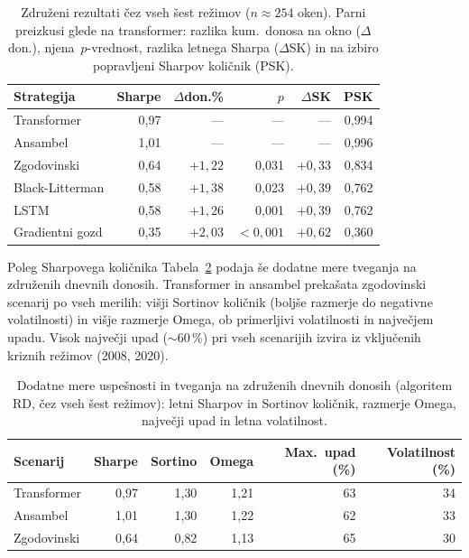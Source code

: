 \begin{table}[htbp]
  \centering
  \caption{Združeni rezultati čez vseh šest režimov ($n\approx 254$ oken). Parni preizkusi glede na transformer: razlika kum.\ donosa na okno ($\Delta$don.), njena~$p$-vrednost, razlika letnega Sharpa ($\Delta$SK) in na izbiro popravljeni Sharpov količnik (PSK).}
  \label{tab:pooled}
  \begin{tabular}{lrrrrr}
    \toprule
    Strategija & Sharpe & $\Delta$don.\% & $p$ & $\Delta$SK & PSK\\
    \midrule
    Transformer      & 0{,}97 & ---   & ---     & ---    & 0{,}994\\
    Ansambel         & 1{,}01 & ---   & ---     & ---    & 0{,}996\\
    Zgodovinski      & 0{,}64 & $+1{,}22$ & 0{,}031 & $+0{,}33$ & 0{,}834\\
    Black-Litterman  & 0{,}58 & $+1{,}38$ & 0{,}023 & $+0{,}39$ & 0{,}762\\
    LSTM             & 0{,}58 & $+1{,}26$ & 0{,}001 & $+0{,}39$ & 0{,}762\\
    Gradientni gozd  & 0{,}35 & $+2{,}03$ & $<0{,}001$ & $+0{,}62$ & 0{,}360\\
    \bottomrule
  \end{tabular}
\end{table}

Poleg Sharpovega količnika Tabela~\ref{tab:pooledrisk} podaja še dodatne mere tveganja na združenih dnevnih donosih. Transformer in ansambel prekašata zgodovinski scenarij po vseh merilih: višji Sortinov količnik (boljše razmerje do negativne volatilnosti) in višje razmerje Omega, ob primerljivi volatilnosti in največjem upadu. Visok največji upad ($\sim\!60\,\%$) pri vseh scenarijih izvira iz vključenih kriznih režimov (2008, 2020).

\begin{table}[htbp]
  \centering
  \caption{Dodatne mere uspešnosti in tveganja na združenih dnevnih donosih (algoritem RD, čez vseh šest režimov): letni Sharpov in Sortinov količnik, razmerje Omega, največji upad in letna volatilnost.}
  \label{tab:pooledrisk}
  \begin{tabular}{lrrrrr}
    \toprule
    Scenarij & Sharpe & Sortino & Omega & Max.\ upad (\%) & Volatilnost (\%)\\
    \midrule
    Transformer & 0{,}97 & 1{,}30 & 1{,}21 & 63 & 34\\
    Ansambel    & 1{,}01 & 1{,}30 & 1{,}22 & 62 & 33\\
    Zgodovinski & 0{,}64 & 0{,}82 & 1{,}13 & 65 & 30\\
    \bottomrule
  \end{tabular}
\end{table}

